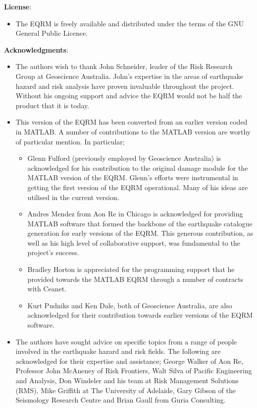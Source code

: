 \documentclass{article}
\begin{document}
\textbf{License}:
\begin{itemize}
\item The EQRM is freely available and distributed under the terms of the GNU General Public Licence.
\end{itemize}

\newpage
\textbf{Acknowledgments}:
\begin{itemize}

\item  The authors wish to thank John Schneider, leader of the Risk
Research Group at Geoscience Australia. John's expertise in the
areas of earthquake hazard and risk analysis have proven invaluable
throughout the project. Without his ongoing support and advice the
EQRM would not be half the product that it is today.

\item This version of the EQRM has been converted from an earlier
version coded in MATLAB. A number of contributions to the MATLAB
version are worthy of particular mention. In particular;
\begin{itemize}
\item Glenn Fulford (previously employed by Geoscience Australia) is
acknowledged for his contribution to the original
damage module for the MATLAB version of the EQRM. Glenn's efforts
were instrumental in getting the first version of the EQRM
operational. Many of his ideas are utilised in the current version.
\item Andres Mendez from Aon Re in Chicago is acknowledged for
providing MATLAB software that formed the backbone of the earthquake
catalogue generation for early versions of the EQRM. This generous
contribution, as well as his high level of collaborative support,
was fundamental to the project's success. \item Bradley Horton is
appreciated for the programming support that he provided towards the
MATLAB EQRM through a number of contracts with Ceanet. \item Kurt
Pudniks and Ken Dale, both of Geoscience Australia, are also
acknowledged for their contribution towards earlier versions of the
EQRM software.
\end{itemize}

\item The authors have sought advice on specific topics from a range
of people involved in the earthquake hazard and risk fields. The
following are acknowledged for their expertise and assistance;
George Walker of Aon Re, Professor John McAneney of Risk Frontiers,
Walt Silva of Pacific Engineering and Analysis, Don Windeler and his
team at Risk Management Solutions (RMS), Mike Griffith at The
University of Adelaide, Gary Gibson of the Seismology Research
Centre and Brian Gaull from Guria Consulting.


\end{itemize}
\end{document}
